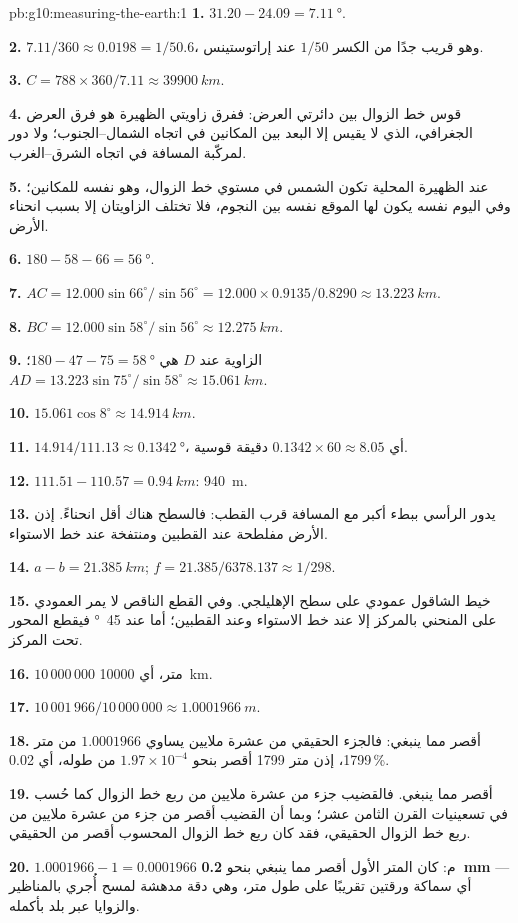 \begin{solution}{pb:g10:measuring-the-earth:1}
\textbf{1.} $31.20 - 24.09 = \qty{7.11}{\degree}$.

\textbf{2.} $7.11/360 \approx 0.0198 = 1/50.6$، وهو قريب جدًا من الكسر
$1/50$ عند إراتوستينس.

\textbf{3.} $C = 788 \times 360/7.11 \approx \qty{39900}{km}$.

\textbf{4.} قوس خط الزوال بين دائرتي العرض: ففرق زاويتي الظهيرة هو فرق العرض
الجغرافي، الذي لا يقيس إلا البعد بين المكانين في اتجاه الشمال--الجنوب؛ ولا دور
لمركّبة المسافة في اتجاه الشرق--الغرب.

\textbf{5.} عند الظهيرة المحلية تكون الشمس في مستوي خط الزوال، وهو نفسه
للمكانين؛ وفي اليوم نفسه يكون لها الموقع نفسه بين النجوم، فلا تختلف الزاويتان
إلا بسبب انحناء الأرض.

\textbf{6.} $180 - 58 - 66 = \qty{56}{\degree}$.

\textbf{7.} $AC = 12.000 \sin 66^\circ/\sin 56^\circ = 12.000 \times
0.9135/0.8290 \approx \qty{13.223}{km}$.

\textbf{8.} $BC = 12.000 \sin 58^\circ/\sin 56^\circ \approx \qty{12.275}{km}$.

\textbf{9.} الزاوية عند $D$ هي $180 - 47 - 75 = \qty{58}{\degree}$؛
$AD = 13.223 \sin 75^\circ/\sin 58^\circ \approx \qty{15.061}{km}$.

\textbf{10.} $15.061 \cos 8^\circ \approx \qty{14.914}{km}$.

\textbf{11.} $14.914/111.13 \approx \qty{0.1342}{\degree}$، أي
$0.1342 \times 60 \approx 8.05$ دقيقة قوسية.

\textbf{12.} $111.51 - 110.57 = \qty{0.94}{km}$: \qty{940}{m}.

\textbf{13.} يدور الرأسي ببطء أكبر مع المسافة قرب القطب: فالسطح هناك أقل
انحناءً. إذن الأرض مفلطحة عند القطبين ومنتفخة عند خط
الاستواء.

\textbf{14.} $a - b = \qty{21.385}{km}$; $f = 21.385/6378.137 \approx 1/298$.

\textbf{15.} خيط الشاقول عمودي على سطح الإهليلجي. وفي القطع الناقص لا يمر
العمودي على المنحني بالمركز إلا عند خط الاستواء وعند القطبين؛ أما عند
\qty{45}{\degree} فيقطع المحور تحت المركز.

\textbf{16.} $10\,000\,000$ متر، أي \qty{10000}{km}.

\textbf{17.} $10\,001\,966/10\,000\,000 \approx \qty{1.0001966}{m}$.

\textbf{18.} أقصر مما ينبغي: فالجزء الحقيقي من عشرة ملايين يساوي $1.0001966$ من
متر 1799، إذن متر 1799 أقصر بنحو $1.97 \times 10^{-4}$ من
طوله، أي 0.02\,\%.

\textbf{19.} أقصر مما ينبغي. فالقضيب جزء من عشرة ملايين من ربع خط الزوال كما
حُسب في تسعينيات القرن الثامن عشر؛ وبما أن القضيب أقصر من جزء من عشرة ملايين
من ربع خط الزوال الحقيقي، فقد كان ربع خط الزوال المحسوب أقصر من
الحقيقي.

\textbf{20.} $1.0001966 - 1 = 0.0001966$ م: كان المتر الأول أقصر مما ينبغي
بنحو \textbf{\qty{0.2}{mm}} --- أي سماكة ورقتين تقريبًا على طول متر، وهي دقة
مدهشة لمسح أُجري بالمناظير والزوايا عبر بلد
بأكمله.
\end{solution}
